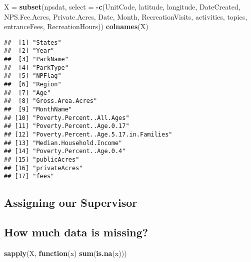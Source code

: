 \documentclass[
]{article}
\newenvironment{Shaded}{\begin{snugshade}}{\end{snugshade}}
\newcommand{\ControlFlowTok}[1]{\textcolor[rgb]{0.13,0.29,0.53}{\textbf{#1}}}
\newcommand{\DataTypeTok}[1]{\textcolor[rgb]{0.13,0.29,0.53}{#1}}
\newcommand{\KeywordTok}[1]{\textcolor[rgb]{0.13,0.29,0.53}{\textbf{#1}}}
\newcommand{\NormalTok}[1]{#1}
\newcommand{\OperatorTok}[1]{\textcolor[rgb]{0.81,0.36,0.00}{\textbf{#1}}}
\newcommand{\StringTok}[1]{\textcolor[rgb]{0.31,0.60,0.02}{#1}}
\begin{document}
\begin{Shaded}
\begin{Highlighting}[]
\NormalTok{X =}\StringTok{ }\KeywordTok{subset}\NormalTok{(npsdat, }\DataTypeTok{select =} \OperatorTok{-}\KeywordTok{c}\NormalTok{(UnitCode, latitude, longitude, DateCreated, NPS.Fee.Acres, Private.Acres, Date, Month, RecreationVisits, activities, topics, entranceFees, RecreationHours))}
\KeywordTok{colnames}\NormalTok{(X)}
\end{Highlighting}
\end{Shaded}

\begin{verbatim}
##  [1] "States"                               
##  [2] "Year"                                 
##  [3] "ParkName"                             
##  [4] "ParkType"                             
##  [5] "NPFlag"                               
##  [6] "Region"                               
##  [7] "Age"                                  
##  [8] "Gross.Area.Acres"                     
##  [9] "MonthName"                            
## [10] "Poverty.Percent..All.Ages"            
## [11] "Poverty.Percent..Age.0.17"            
## [12] "Poverty.Percent..Age.5.17.in.Families"
## [13] "Median.Household.Income"              
## [14] "Poverty.Percent..Age.0.4"             
## [15] "publicAcres"                          
## [16] "privateAcres"                         
## [17] "fees"
\end{verbatim}

\hypertarget{assigning-our-supervisor}{%
\subsection{Assigning our Supervisor}\label{assigning-our-supervisor}}

\begin{Shaded}
\end{Shaded}

\hypertarget{how-much-data-is-missing}{%
\subsection{How much data is missing?}\label{how-much-data-is-missing}}

\begin{Shaded}
\begin{Highlighting}[]
\KeywordTok{sapply}\NormalTok{(X, }\ControlFlowTok{function}\NormalTok{(x) }\KeywordTok{sum}\NormalTok{(}\KeywordTok{is.na}\NormalTok{(x)))}
\end{Highlighting}
\end{Shaded}
\end{document}
